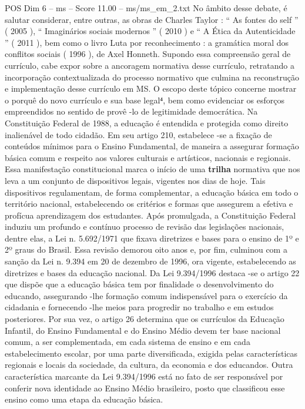 \begin{textsample}{POS Dim 6 – ms – Score 11.00 – ms/ms\_em\_2.txt}
No âmbito desse debate, é salutar considerar, entre outras, as obras de Charles Taylor : “ As fontes do self ” ( 2005 ), “ Imaginários sociais modernos ” ( 2010 ) e “ A Ética da Autenticidade ” ( 2011 ), bem como o livro Luta por reconhecimento : a gramática moral dos conflitos sociais ( 1996 ), de Axel Honneth.
Supondo essa compreensão geral de currículo, cabe expor sobre a ancoragem normativa desse currículo, retratando a incorporação contextualizada do processo normativo que culmina na reconstrução e implementação desse currículo em MS.
O escopo deste tópico concerne mostrar o porquê do novo currículo e sua base legal⁴, bem como evidenciar os esforços empreendidos no sentido de provê -lo de legitimidade democrática.
Na Constituição Federal de 1988, a educação é entendida e protegida como direito inalienável de todo cidadão.
Em seu artigo 210, estabelece -se a fixação de conteúdos mínimos para o Ensino Fundamental, de maneira a assegurar formação básica comum e respeito aos valores culturais e artísticos, nacionais e regionais.
Essa manifestação constitucional marca o início de uma \textbf{trilha} normativa que nos leva a um conjunto de dispositivos legais, vigentes nos dias de hoje.
Tais dispositivos regulamentam, de forma complementar, a educação básica em todo o território nacional, estabelecendo os critérios e formas que assegurem a efetiva e profícua aprendizagem dos estudantes.
Após promulgada, a Constituição Federal induziu um profundo e contínuo processo de revisão das legislações nacionais, dentre elas, a Lei n. 5.692/1971 que fixava diretrizes e bases para o ensino de 1º e 2º graus do Brasil.
Essa revisão demorou oito anos e, por fim, culminou com a sanção da Lei n. 9.394 em 20 de dezembro de 1996, ora vigente, estabelecendo as diretrizes e bases da educação nacional.
Da Lei 9.394/1996 destaca -se o artigo 22 que dispõe que a educação básica tem por finalidade o desenvolvimento do educando, assegurando -lhe formação comum indispensável para o exercício da cidadania e fornecendo -lhe meios para progredir no trabalho e em estudos posteriores.
Por sua vez, o artigo 26 determina que os currículos da Educação Infantil, do Ensino Fundamental e do Ensino Médio devem ter base nacional comum, a ser complementada, em cada sistema de ensino e em cada estabelecimento escolar, por uma parte diversificada, exigida pelas características regionais e locais da sociedade, da cultura, da economia e dos educandos.
Outra característica marcante da Lei 9.394/1996 está no fato de ser responsável por conferir nova identidade ao Ensino Médio brasileiro, posto que classificou esse ensino como uma etapa da educação básica.

\end{textsample}
